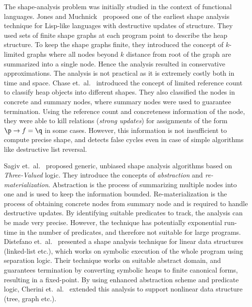 The shape-analysis problem was initially studied in the
context of functional languages. Jones and
Muchnick~\cite{Jones79} proposed one of the earliest shape
analysis technique for Lisp-like languages with destructive
updates of structure. They used sets of finite shape graphs
at each program point to describe the heap structure.  To
keep the shape graphs finite, they introduced the concept of
$k$-limited graphs where all nodes beyond $k$ distance from
root of the graph are summarized into a single node. Hence
the analysis resulted in conservative approximations. The
analysis is not practical as it is extremely costly both in
time and space.
%
Chase et.~al.~\cite{Chase90} introduced the concept of limited
reference count to classify heap objects into different
shapes. They also classified the nodes in concrete and
summary nodes, where summary nodes were used to guarantee
termination. Using the reference count and concreteness
information of the node, they were able to kill relations
({\em strong updates}) for assignments of the form $\p\rightarrow f = \q$
in some cases. However, this information is not
insufficient to compute precise shape, and detects false
cycles even in case of simple algorithms like destructive list
reversal.

Sagiv et.~al.~\cite{Sagiv96,Sagiv02toplas} proposed
generic, unbiased shape analysis algorithms based on {\em
  Three-Valued} logic. They introduce the concepts of {\em
  abstraction} and {\em re-materialization}. Abstraction is
the process of summarizing multiple nodes into one and is
used to keep the information bounded.  Re-materialization is
the process of obtaining concrete nodes from summary node and
is required to handle destructive updates. By identifying
suitable predicates to track, the analysis can be made very
precise.  However, the technique has potentially exponential
run-time in the number of predicates, and therefore not
suitable for large programs.
%
Distefano et.\ al.~\cite{distefano06local} presented a shape
analysis technique for linear data structures (linked-list
etc.), which works on symbolic execution of the whole program
using separation logic. Their technique works on suitable
abstract domain, and guarantees termination by converting
symbolic heaps to finite canonical forms, resulting in a
fixed-point. By using enhanced abstraction scheme and
predicate logic, Cherini et.~al.~\cite{cherini10shape}
extended this analysis to support nonlinear data structure
(tree, graph etc.).

